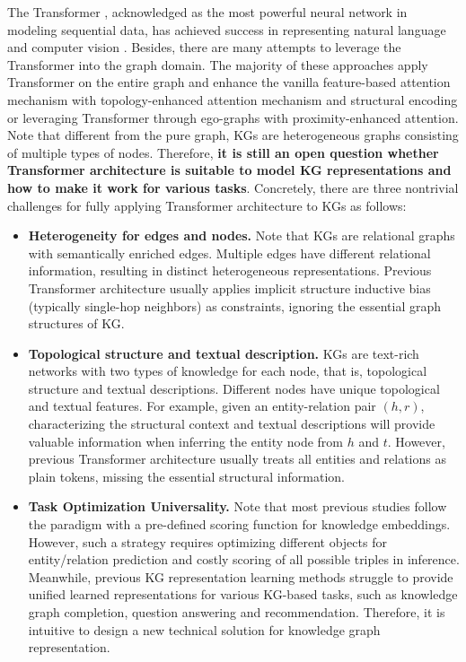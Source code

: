 \documentclass[sigconf]{acmart}
\begin{document}
The Transformer \cite{transformers}, acknowledged as the most powerful neural network in modeling sequential data, has achieved success in representing natural language \cite{BERT} and computer vision \cite{DBLP:conf/iclr/DosovitskiyB0WZ21}. 
Besides, there are many attempts to leverage the Transformer into the graph domain. 
The majority of these approaches \cite{Graphormer,Gophormer} apply Transformer on the entire graph and enhance the vanilla feature-based attention mechanism with topology-enhanced attention mechanism and structural encoding or leveraging Transformer through ego-graphs with proximity-enhanced attention. 
Note that different from the pure graph, KGs are heterogeneous graphs consisting of multiple types of nodes.
Therefore, \textbf{it is still an open question whether Transformer architecture is suitable to model KG representations and how to make it work for various tasks}.
Concretely, there are three nontrivial challenges for fully applying Transformer architecture to KGs as follows:
\begin{itemize}
\item  \textbf{Heterogeneity for edges and nodes.}
Note that  KGs are relational graphs with semantically enriched edges. 
Multiple edges have different relational information, resulting in distinct heterogeneous representations. 
Previous Transformer architecture usually applies implicit structure inductive bias (typically single-hop neighbors) as constraints, ignoring the essential graph structures of KG.

\item  \textbf{Topological structure and textual description.}
KGs are text-rich networks with two types of knowledge for each node, that is, topological structure and textual descriptions.
Different nodes have unique topological and textual features.
For example, given an entity-relation pair $(h,r)$, characterizing the structural context and textual descriptions will provide valuable information when inferring the entity node from $h$ and $t$.
However, previous Transformer architecture usually treats all entities and relations as plain tokens, missing the essential structural information.


\item  \textbf{Task Optimization Universality.} 
Note that most previous studies \cite{TransE} follow the paradigm with a pre-defined scoring function for knowledge embeddings. 
However, such a strategy requires optimizing different objects for entity/relation prediction and costly scoring of all possible triples in inference. 
Meanwhile, previous KG representation learning methods struggle to provide unified learned representations for various KG-based tasks, such as knowledge graph completion, question answering and recommendation.
Therefore, it is intuitive to design a new technical solution for knowledge graph representation.

\end{itemize}
\end{document}
